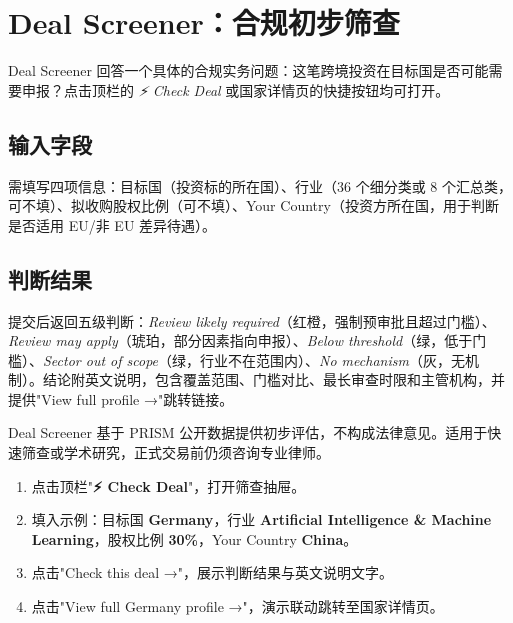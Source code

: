 \documentclass[12pt,a4paper]{article}
\newcommand{\uielem}[1]{\textit{#1}}
\begin{document}
\section{Deal Screener：合规初步筛查}

Deal Screener 回答一个具体的合规实务问题：这笔跨境投资在目标国是否可能需要申报？点击顶栏的 \uielem{⚡ Check Deal} 或国家详情页的快捷按钮均可打开。

\subsection{输入字段}

需填写四项信息：目标国（投资标的所在国）、行业（36 个细分类或 8 个汇总类，可不填）、拟收购股权比例（可不填）、Your Country（投资方所在国，用于判断是否适用 EU/非 EU 差异待遇）。

\subsection{判断结果}

提交后返回五级判断：\textit{Review likely required}（红橙，强制预审批且超过门槛）、\textit{Review may apply}（琥珀，部分因素指向申报）、\textit{Below threshold}（绿，低于门槛）、\textit{Sector out of scope}（绿，行业不在范围内）、\textit{No mechanism}（灰，无机制）。结论附英文说明，包含覆盖范围、门槛对比、最长审查时限和主管机构，并提供"View full profile →"跳转链接。

\begin{tipbox}[注意]
  Deal Screener 基于 PRISM 公开数据提供初步评估，不构成法律意见。适用于快速筛查或学术研究，正式交易前仍须咨询专业律师。
\end{tipbox}

\begin{demobox}
  \begin{enumerate}
    \item 点击顶栏"\textbf{⚡ Check Deal}"，打开筛查抽屉。
    \item 填入示例：目标国 \textbf{Germany}，行业 \textbf{Artificial Intelligence \& Machine Learning}，股权比例 \textbf{30\%}，Your Country \textbf{China}。
    \item 点击"Check this deal →"，展示判断结果与英文说明文字。
    \item 点击"View full Germany profile →"，演示联动跳转至国家详情页。
  \end{enumerate}
\end{demobox}
\end{document}
